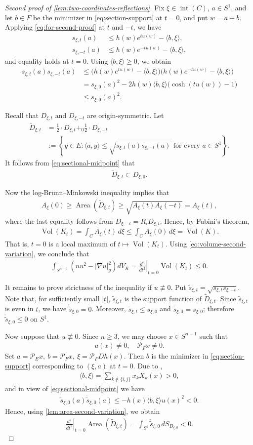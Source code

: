 \documentclass[12pt]{amsart}
\newcommand{\Sn}{S^{n-1}}
\newcommand{\ip}[2]{\langle #1,#2\rangle}
\newcommand{\eq}[1]{\begin{equation}\begin{alignedat}{2}#1\end{alignedat}\end{equation}}
\theoremstyle{plain}
\theoremstyle{definition}
\theoremstyle{remark}
\numberwithin{equation}{section}
\begin{document}
\begin{proof}[Second proof of \autoref{lem:two-coordinates-reflections}]
Fix $\xi\in\operatorname{int}(C)$, $a\in S^1$, and let $b\in F$ be the minimizer in \eqref{eq:section-support} at $t=0$, and put $w=a+b$. Applying \eqref{eq:for-second-proof} at $t$ and $-t$, we have
\eq{
 s_{\xi,t}(a)&\leq h(w)e^{tu(w)}-\ip{b}{\xi},\\
 s_{\xi,-t}(a)&\leq h(w)e^{-tu(w)}-\ip{b}{\xi},
}
and equality holds at $t=0$. Using $\ip{b}{\xi}\geq 0$, we obtain
\eq{\label{eq:sectional-midpoint}
 s_{\xi,t}(a)s_{\xi,-t}(a)
 &\leq
 \big(h(w)e^{tu(w)}-\ip{b}{\xi}\big)
 \big(h(w)e^{-tu(w)}-\ip{b}{\xi}\big)\\
 &=s_{\xi,0}(a)^2-2h(w)\ip{b}{\xi}\big(\cosh(tu(w))-1\big)\\
 &\leq s_{\xi,0}(a)^2.
}

Recall that $D_{\xi,t}$ and $D_{\xi,-t}$ are origin-symmetric. Let
\eq{
\widetilde{D}_{\xi,t}&=\frac{1}{2}\cdot D_{\xi,t}+_0\frac{1}{2}\cdot D_{\xi,-t}\\
 &:=\left\{y\in E:\ip{a}{y}\leq \sqrt{s_{\xi,t}(a)s_{\xi,-t}(a)} \text{ for every }a\in S^1\right\}.
}
It follows from \eqref{eq:sectional-midpoint} that
\eq{
\widetilde{D}_{\xi,t}\subset D_{\xi,0}.
}

Now the log-Brunn--Minkowski inequality \cite[Thm. 1.3]{BLYZ12} implies that
\eq{
A_{\xi}(0)\geq\operatorname{Area}(\widetilde{D}_{\xi,t})\geq\sqrt{A_{\xi}(t)A_{\xi}(-t)}=A_{\xi}(t),
}
where the last equality follows from $D_{\xi,-t}=R_iD_{\xi,t}$. Hence, by Fubini's theorem,
\eq{
 \operatorname{Vol}(K_t)=\int_C A_{\xi}(t)\,d\xi\leq\int_C A_{\xi}(0)\,d\xi=\operatorname{Vol}(K).
}
That is, $t=0$ is a local maximum of $t\mapsto\operatorname{Vol}(K_t)$. Using \eqref{eq:volume-second-variation}, we conclude that
\eq{
\int_{\Sn}\left(nu^2-|\nabla u|_g^2\right)dV_K=\left.\frac{d^2}{dt^2}\right|_{t=0}\operatorname{Vol}(K_t)\leq 0.
}

It remains to prove strictness of the inequality if $u\not\equiv 0$. Put $\tilde{s}_{\xi,t}=\sqrt{s_{\xi,t}s_{\xi,-t}}$. Note that, for sufficiently small $|t|$, $\tilde{s}_{\xi,t}$ is the support function of $\widetilde{D}_{\xi,t}$. Since $\tilde{s}_{\xi,t}$ is even in $t$, we have $\dot{\tilde{s}}_{\xi,0}=0$. Moreover, $\tilde{s}_{\xi,t}\leq s_{\xi,0}$ and $\tilde{s}_{\xi,0}=s_{\xi,0}$; therefore $\ddot{\tilde{s}}_{\xi,0}\leq 0$ on $S^1$.

Now suppose that $u\not\equiv 0$. Since $n\geq 3$, we may choose $x\in\Sn$ such
that
\eq{
 u(x)\neq 0,\quad \mathcal{P}_Fx\neq 0.
}
Set $a=\mathcal{P}_Ex,\ b=\mathcal{P}_Fx,\ \xi=\mathcal{P}_FDh(x)$. Then $b$ is the minimizer in \eqref{eq:section-support} corresponding to $(\xi,a)$ at $t=0$. Due to \cite[Lem. 2.3]{HI26},
\eq{
 \ip{b}{\xi}
 =\sum_{k\notin\{i,j\}}x_kX_k(x)>0,
}
and in view of \eqref{eq:sectional-midpoint} we have
\eq{
 \tilde{s}_{\xi,0}(a)\ddot{\tilde{s}}_{\xi,0}(a)
 \leq-h(x)\ip{b}{\xi}u(x)^2<0.
}
Hence, using \autoref{lem:area-second-variation}, we obtain
\eq{
 \left.\frac{d^2}{dt^2}\right|_{t=0}
 \operatorname{Area}(\widetilde{D}_{\xi,t})
 =\int_{S^1}\ddot{\tilde{s}}_{\xi,0}\,dS_{D_{\xi,0}}<0.
}


\end{proof}
\end{document}

